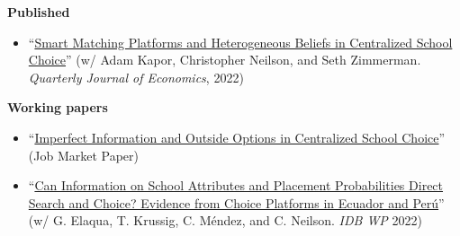 \documentclass[letter,9pt]{extarticle}
\begin{document}
\noindent
\textbf{Published}
\begin{itemize}
    \item ``\href{https://academic.oup.com/qje/article/137/3/1791/6544686?login=false}{Smart Matching Platforms and Heterogeneous Beliefs in Centralized School Choice}'' (w/ Adam Kapor, Christopher Neilson, and Seth Zimmerman. \textit{Quarterly Journal of Economics}, 2022)    \end{itemize}
\noindent
\textbf{Working papers} 
\begin{itemize}
    \item ``\href{https://fharteaga.github.io/pdfs/arteagaJMP.pdf}{Imperfect Information and Outside Options in Centralized School Choice}''  (Job Market Paper)
    \item ``\href{https://publications.iadb.org/en/can-information-school-attributes-and-placement-probabilities-direct-search-and-choice-evidence}{Can Information on School Attributes and Placement Probabilities Direct Search and Choice? Evidence from Choice Platforms in Ecuador and Perú}'' (w/ G. Elaqua, T. Krussig, C. Méndez, and C. Neilson. \textit{IDB WP} 2022)
\end{itemize}



\end{document}
